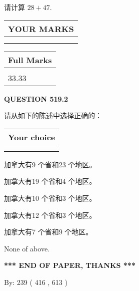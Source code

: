 \documentclass{ctexart}
\begin{document}
  
 
请计算 $ %
28 +  %
47 $.
 

 

 
  
\vspace{0.2in}
  
\noindent\begin{tabular}{|l|}
\hline
 YOUR MARKS  \\
\hline
 \\ 
 \\ 
\hline
\end{tabular}
\hspace{0.05in} \begin{tabular}{|l|}
\hline
 Full Marks  \\
\hline
 \\ 
33.33 \\
\hline
\end{tabular}
{\textbf{\Large{QUESTION
519.2 
}}}
  
  
请从如下的陈述中选择正确的：
  
  
\noindent\hspace{3.0in} \begin{tabular}{|l|}
\hline
Your choice \\
\hline
 \\ 
 \\ 
\hline
\end{tabular}
  
  
 
 
加拿大有9 个省和23 个地区。
 
 
加拿大有19 个省和4 个地区。
 
 
加拿大有10 个省和3 个地区。
 
 
加拿大有12 个省和3 个地区。
 
 
加拿大有7 个省和9 个地区。
 
 
 None of above.
 
 
   
   
 \vspace{0.2in}
 
   
   
   
   
\vspace{1.0in} 
{\textbf{\large{ *** END OF PAPER, THANKS *** }}} 
   
   
\hspace{1.0in} By: 
 239 ( 416 ,  613 )
   
\end{document}
